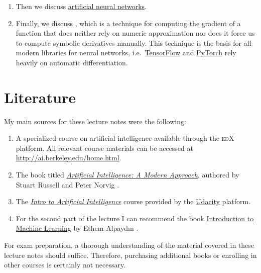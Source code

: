 \begin{enumerate}
      In particular, we will discuss , since this is needed later when discussing
      neural networks.
\item Then we discuss \href{https://en.wikipedia.org/wiki/Artificial_neural_network}{artificial neural
      networks}.
\item Finally, we discuss , which is a technique for computing the gradient of
      a function that does neither rely on numeric approximation nor does it force us to compute symbolic
      derivatives manually.   This technique is the basis for all modern libraries for neural networks,
      i.e.~\href{https://www.tensorflow.org}{TensorFlow} and \href{https://pytorch.org}{PyTorch} rely heavily
      on automatic differentiation.
\end{enumerate}

\section{Literature}
My main sources for these lecture notes were the following:
\begin{enumerate}
    \item A specialized course on artificial intelligence available through the \textsc{edX} platform. All
          relevant course materials can be accessed at
          \href{http://ai.berkeley.edu/home.html}{http://ai.berkeley.edu/home.html}. 
    \item The book titled
          \href{https://www.amazon.de/Artificial-Intelligence-Modern-Approach-Global/dp/1292401133/}{\textit{Artificial Intelligence: A Modern Approach}},
          authored by Stuart Russell and Peter Norvig \cite{russell:2020}. 
    \item The \href{https://www.udacity.com/course/intro-to-artificial-intelligence--cs271}{\textit{Intro to
          Artificial Intelligence}} course provided by the \href{https://www.udacity.com}{Udacity} platform. 
    \item For the second part of the lecture I can recommend the book
          \href{https://faculty.ozyegin.edu.tr/ethemalpaydin/books/}{Introduction to Machine Learning} by Ethem
          Alpayd{\i}n \cite{alpaydin:2020}.     
\end{enumerate}
For exam preparation, a thorough understanding of the material covered in these lecture notes should
suffice. Therefore, purchasing additional books or enrolling in other courses is certainly not necessary.
\vspace{0.3cm}

